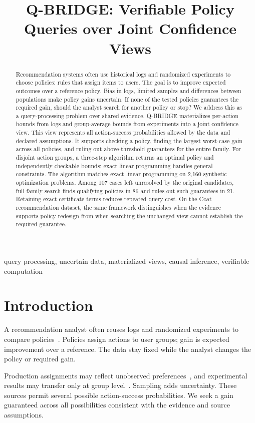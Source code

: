 \documentclass[conference]{IEEEtran}
\title{Q-BRIDGE: Verifiable Policy Queries over Joint Confidence Views}
\begin{document}
\maketitle
\begin{abstract}
Recommendation systems often use historical logs and randomized experiments to choose policies: rules that assign items to users. The goal is to improve expected outcomes over a reference policy. Bias in logs, limited samples and differences between populations make policy gains uncertain. If none of the tested policies guarantees the required gain, should the analyst search for another policy or stop? We address this as a query-processing problem over shared evidence. Q-BRIDGE materializes per-action bounds from logs and group-average bounds from experiments into a joint confidence view. This view represents all action-success probabilities allowed by the data and declared assumptions. It supports checking a policy, finding the largest worst-case gain across all policies, and ruling out above-threshold guarantees for the entire family. For disjoint action groups, a three-step algorithm returns an optimal policy and independently checkable bounds; exact linear programming handles general constraints. The algorithm matches exact linear programming on 2,160 synthetic optimization problems. Among 107 cases left unresolved by the original candidates, full-family search finds qualifying policies in 86 and rules out such guarantees in 21. Retaining exact certificate terms reduces repeated-query cost. On the Coat recommendation dataset, the same framework distinguishes when the evidence supports policy redesign from when searching the unchanged view cannot establish the required guarantee.

\end{abstract}
\begin{IEEEkeywords}
query processing, uncertain data, materialized views, causal inference, verifiable computation
\end{IEEEkeywords}

\section{Introduction}
A recommendation analyst often reuses logs and randomized experiments to compare policies~\cite{schnabel2016coat}. Policies assign actions to user groups; gain is expected improvement over a reference. The data stay fixed while the analyst changes the policy or required gain.

Production assignments may reflect unobserved preferences~\cite{Kallus2018ConfoundingRobust}, and experimental results may transfer only at group level~\cite{lanners2025fusion}. Sampling adds uncertainty. These sources permit several possible action-success probabilities. We seek a gain guaranteed across all possibilities consistent with the evidence and source assumptions.
\end{document}
